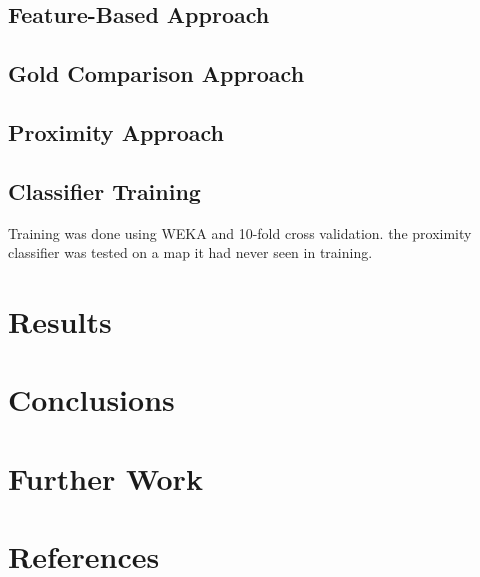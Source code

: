 \documentclass[preprint,3p,12pt]{elsarticle}
\begin{document}


\subsection{Feature-Based Approach}
\label{process:featurebased}



\subsection{Gold Comparison Approach}



\subsection{Proximity Approach}
\label{process:proximity}



\subsection{Classifier Training}
\label{process:training}
Training was done using WEKA and 10-fold cross validation.
the proximity classifier was tested on a map it had never seen in training.

\section{Results}
\label{results}



\section{Conclusions}
\label{conclusions}


\section{Further Work}
\label{further work}



\section{References}
\label{references}




\end{document}
